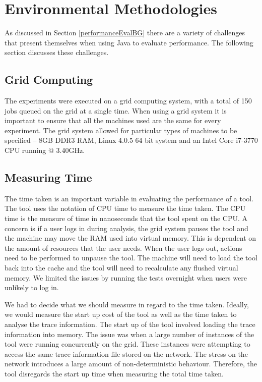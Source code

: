 \section{Environmental Methodologies}
\label{enviro}
As discussed in Section \ref{performanceEvalBG} there are a variety of challenges that present themselves when using Java to evaluate performance. The following section discusses these challenges.

\subsection{Grid Computing}
The experiments were executed on a grid computing system, with a total of 150 jobs queued on the grid at a single time. When using a grid system it is important to ensure that all the machines used are the same for every experiment. The grid system allowed for particular types of machines to be specified -- 8GB DDR3 RAM, Linux 4.0.5 64 bit system and an Intel Core i7-3770 CPU running @ 3.40GHz.

\subsection{Measuring Time }
The time taken is an important variable in evaluating the performance of a tool. The tool uses the notation of CPU time to measure the time taken. The CPU time is the measure of time in nanoseconds that the tool spent on the CPU. A concern is if a user logs in during analysis, the grid system pauses the tool and the machine may move the RAM used into virtual memory. This is dependent on the amount of resources that the user needs. When the user logs out, actions need to be performed to unpause the tool. The machine will need to load the tool back into the cache and the tool will need to recalculate any flushed virtual memory. We limited the issues by running the tests overnight when users were unlikely to log in.

We had to decide what we should measure in regard to the time taken. Ideally, we would measure the start up cost of the tool as well as the time taken to analyse the trace information. The start up of the tool involved loading the trace information into memory. The issue was when a large number of instances of the tool were running concurrently on the grid. These instances were attempting to access the same trace information file stored on the network. The stress on the network introduces a large amount of non-deterministic behaviour. Therefore, the tool disregards the start up time when measuring the total time taken.

